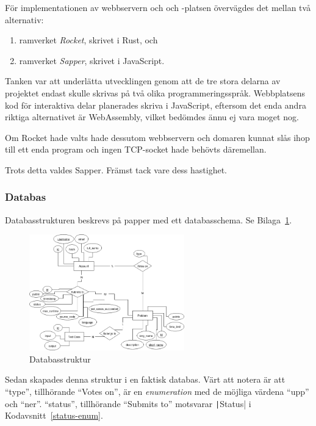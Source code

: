 \documentclass{article}
\renewcommand*\listingscaption{Kodavsnitt}
\renewcommand*\figurename{Bilaga}
\newcommand*\coderef[1]{\listingscaption~\ref{#1}}
\begin{document}
För implementationen av webbservern och och -platsen övervägdes det mellan två
alternativ:

\begin{enumerate}
	\item ramverket \textit{Rocket}, skrivet i Rust, och
	\item ramverket \textit{Sapper}, skrivet i JavaScript.
\end{enumerate}

Tanken var att underlätta utvecklingen genom att de tre stora delarna av
projektet endast skulle skrivas på två olika programmeringsspråk. Webbplatsens
kod för interaktiva delar planerades skriva i JavaScript, eftersom det enda
andra riktiga alternativet är WebAssembly, vilket bedömdes ännu ej vara moget
nog.

Om Rocket hade valts hade dessutom webbservern och domaren kunnat slås ihop till
ett enda program och ingen TCP-socket hade behövts däremellan.

Trots detta valdes Sapper. Främst tack vare dess hastighet.

\subsubsection{Databas}

Databasstrukturen beskrevs på papper med ett databasschema. Se
\figurename{}~\ref{dbschema}.

\begin{figure}[H]
	\centering
	\includegraphics[width=0.6\textwidth]{database-schema}
	\caption{Databasstruktur}\label{dbschema}
\end{figure}

Sedan skapades denna struktur i en faktisk databas. Värt att notera är att
``type'', tillhörande ``Votes on'', är en \textit{enumeration} med de möjliga
värdena ``upp'' och ``ner''. ``status'', tillhörande ``Submits to'' motsvarar
\texttt|Status| i \coderef{status-enum}.
\end{document}
